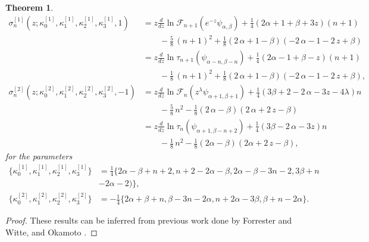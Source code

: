 \documentclass[12pt]{article}
\def\F{\mathcal{F}}
\newtheorem{mydef}{Theorem}[section]
\numberwithin{figure}{section}
\numberwithin{equation}{section}
\numberwithin{table}{section}
\begin{document}
\begin{mydef}
\begin{subequations}
\begin{align}\nonumber
\sigma_n^{[1]}(z;\kappa_0^{[1]},\kappa_1^{[1]},\kappa_2^{[1]},\kappa_3^{[1]},1)&=z\frac{d}{dz}\ln\mathcal{F}_{n+1}(e^{-z}\psi_{\alpha,\beta})+ \tfrac{1}{4}\left(2\alpha+1+\beta+3z\right) (n+1)\\\nonumber&\qquad-\tfrac{5}{8}\,{(n+1)}^{2}+\tfrac{1}{8}\left( 2\,\alpha+1-\beta \right)  \left( -2\,\alpha-1-2\,z+\beta\right)\\\nonumber
&=z\frac{d}{dz}\ln\tau_{n+1}(\psi_{\alpha-n,\beta-n})+\tfrac{1}{4}\left(2\alpha-1+\beta-z\right)
(n+1)\\\nonumber&\qquad-\tfrac{1}{8}\,{(n+1)}^{2}+\tfrac{1}{8}\left( 2\,\alpha+1-\beta \right)  \left( -2\,\alpha-1-2\,z+\beta\right),\\
\sigma_n^{[2]}(z;\kappa_0^{[2]},\kappa_1^{[2]},\kappa_2^{[2]},\kappa_3^{[2]},-1)&=z\frac{d}{dz}\ln\F_n(z^\lambda \psi_{\alpha+1,\beta+1})+\tfrac{1}{4}\left(3\beta+
2-2\,\alpha-3z-4\lambda \right) n\nonumber\\&\qquad-\tfrac{5}{8}\,{n}^{2}-\tfrac{1}{8}\left( 2\,\alpha-\beta \right)  \left( 2\,\alpha+2\,z-\beta\right)\label{sigmasol0}\\\nonumber
&=z\frac{d}{dz}\ln\tau_n(\psi_{\alpha+1,\beta-n+2})+ \tfrac{1}{4}\left(3\beta-2\,\alpha-3z \right)
n\\&\qquad-\tfrac{1}{8}\,{n}^{2}-\tfrac{1}{8}\left( 2\alpha-\beta \right)  \left( 2\alpha+2\,z-\beta\right),\label{sigmasol1}
\end{align}
\end{subequations}
for the parameters
\begin{subequations}
\begin{align}\nonumber
\{\kappa_0^{[1]},\kappa_1^{[1]},\kappa_2^{[1]},\kappa_3^{[1]}\}&=\tfrac{1}{4}\{2\alpha-\beta+n+2,n+2-2\alpha-\beta,2\alpha-\beta-3n-2,3\beta+n\\\qquad&-2\alpha-2)\},\label{paraS1}\\
\{\kappa_0^{[2]},\kappa_1^{[2]},\kappa_2^{[2]},\kappa_3^{[2]}\}&=-\tfrac{1}{4}\{2\alpha+\beta+n,\beta-3n-2\alpha,n+2\alpha-3\beta,\beta+n-2\alpha\}.\label{paraS2}
\end{align}
\end{subequations}
\end{mydef}
\begin{proof}
These results can be inferred from previous work done by Forrester and Witte, \cite{P:57:679} and Okamoto \cite{P:30:305}.
\end{proof}
\end{document}

